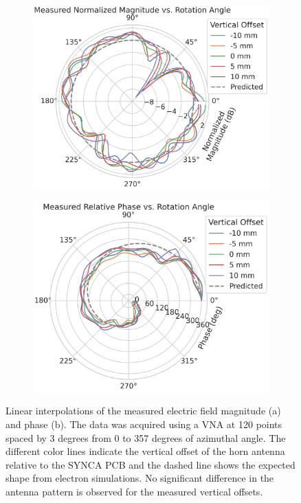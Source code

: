 \begin{figure}[h]
    \centering 
    \begin{subfigure}[b]{0.48\textwidth}
        \centering
        \includegraphics[width=\textwidth]{figs/Chapter-5/221031_mag_vs_rotation_cyclotron_emitter_interpolate.png}
        \caption{\label{fig:vna-meas-mag}}
    \end{subfigure}
    \hfill
    \begin{subfigure}[b]{0.48\textwidth}
        \centering
        \includegraphics[width=1.\textwidth]{figs/Chapter-5/220913_measured_relative_phase_interpolate.png}
        \caption{\label{fig:vna-meas-phase}}
    \end{subfigure}
    \hfill
    \caption{\label{fig:vna-meas} Linear interpolations of the measured electric field magnitude (a) and phase (b). The data was acquired using a VNA at 120 points spaced by 3 degrees from 0 to 357 degrees of azimuthal angle. The different color lines indicate the vertical offset of the horn antenna relative to the SYNCA PCB and the dashed line shows the expected shape from electron simulations. No significant difference in the antenna pattern is observed for the measured vertical offsets.}
    \qquad
\end{figure}

